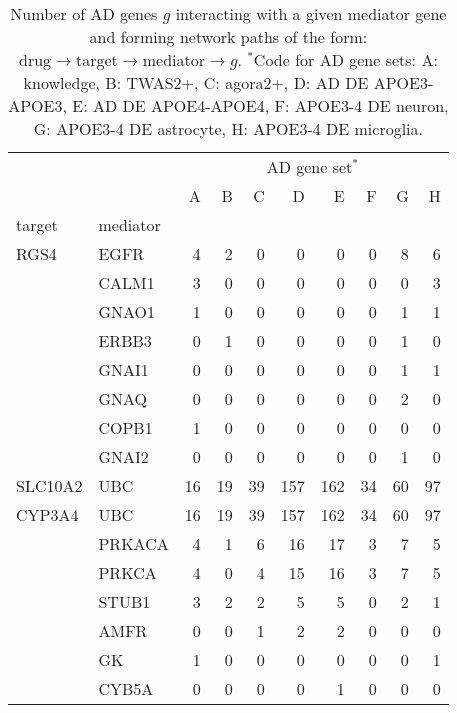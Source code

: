 \documentclass[letterpaper]{article}
\begin{document}
\begin{table}[p]
\begin{tabular}{ll|rrrrrrrr}
\toprule
       &       &   \multicolumn{8}{c}{AD gene set$^\ast$} \\
       &       &   A &   B &   C &    D &    E &   F &   G &   H \\
target & mediator &     &     &     &      &      &     &     &     \\
\midrule
RGS4 & EGFR &   4 &   2 &   0 &    0 &    0 &   0 &   8 &   6 \\
       & CALM1 &   3 &   0 &   0 &    0 &    0 &   0 &   0 &   3 \\
       & GNAO1 &   1 &   0 &   0 &    0 &    0 &   0 &   1 &   1 \\
       & ERBB3 &   0 &   1 &   0 &    0 &    0 &   0 &   1 &   0 \\
       & GNAI1 &   0 &   0 &   0 &    0 &    0 &   0 &   1 &   1 \\
       & GNAQ &   0 &   0 &   0 &    0 &    0 &   0 &   2 &   0 \\
       & COPB1 &   1 &   0 &   0 &    0 &    0 &   0 &   0 &   0 \\
       & GNAI2 &   0 &   0 &   0 &    0 &    0 &   0 &   1 &   0 \\
\midrule
SLC10A2 & UBC &  16 &  19 &  39 &  157 &  162 &  34 &  60 &  97 \\
\midrule
CYP3A4 & UBC &  16 &  19 &  39 &  157 &  162 &  34 &  60 &  97 \\
       & PRKACA &   4 &   1 &   6 &   16 &   17 &   3 &   7 &   5 \\
       & PRKCA &   4 &   0 &   4 &   15 &   16 &   3 &   7 &   5 \\
       & STUB1 &   3 &   2 &   2 &    5 &    5 &   0 &   2 &   1 \\
       & AMFR &   0 &   0 &   1 &    2 &    2 &   0 &   0 &   0 \\
       & GK &   1 &   0 &   0 &    0 &    0 &   0 &   0 &   1 \\
       & CYB5A &   0 &   0 &   0 &    0 &    1 &   0 &   0 &   0 \\
\bottomrule
\end{tabular}
\caption{
  Number of AD genes $g$ interacting with a given mediator gene and forming
  network paths of the form: $\mathrm{drug} \rightarrow \mathrm{target}
  \rightarrow \mathrm{mediator} \rightarrow g$.  $^\ast$Code for AD gene sets:
  A: knowledge, B: TWAS2+, C: agora2+, D: AD DE APOE3-APOE3, E: AD DE
  APOE4-APOE4, F: APOE3-4 DE neuron, G: APOE3-4 DE astrocyte, H: APOE3-4 DE
  microglia.
}
\label{tab:mediators}
\end{table}
\end{document}
